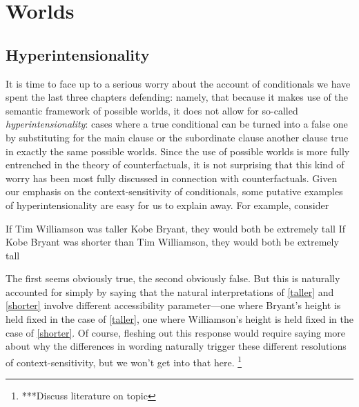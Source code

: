 \documentclass[If.tex]{subfiles}
\begin{document}
\chapter{Worlds}
\label{chap:worlds}

\section{Hyperintensionality}
\label{sect:hyperintensionality}
It is time to face up to a serious worry about the account of conditionals we have spent the last three chapters defending: namely, that because it makes use of the semantic framework of possible worlds, it does not allow for so-called \emph{hyperintensionality}: cases where a true conditional can be turned into a false one by substituting for the main clause or the subordinate clause another clause true in exactly the same possible worlds.  Since the use of possible worlds is more fully entrenched in the theory of counterfactuals, it is not surprising that this kind of worry has been most fully discussed in connection with counterfactuals.  Given our emphasis on the context-sensitivity of conditionals, some putative examples of hyperintensionality are easy for us to explain away.  For example, consider 
\begin{prop}
	\nitem 
	\begin{prop}
		\aitem \label{taller}
		If Tim Williamson was taller Kobe Bryant, they would both be extremely tall
		\aitem \label{shorter}
		If Kobe Bryant was shorter than Tim Williamson, they would both be extremely tall
	\end{prop}
\end{prop}
The first seems obviously true, the second obviously false.  But this is naturally accounted for simply by saying that the natural interpretations of \ref{taller} and \ref{shorter} involve different accessibility parameter---one where Bryant's height is held fixed in the case of \ref{taller}, one where Williamson's height is held fixed in the case of \ref{shorter}.  Of course, fleshing out this response would require saying more about why the differences in wording naturally trigger these different resolutions of context-sensitivity, but we won't get into that here.%
\footnote{***Discuss literature on topic}
\end{document}
